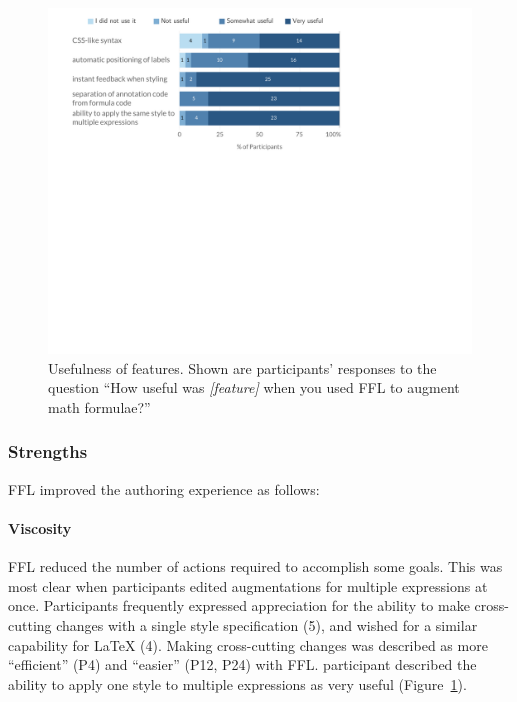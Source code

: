\begin{figure}
    \centering
    \includegraphics[width=\linewidth]{fig/Useful.pdf}
    \vspace{-3ex}
    \caption{Usefulness of features. \normalfont Shown are participants' responses to the question ``How useful was \emph{[feature]} when you used FFL to augment math formulae?''
    }
    \label{fig:features_use}
\end{figure}

\subsubsection{Strengths} FFL improved the authoring experience as follows:

\paragraph{Viscosity}
FFL reduced the number of actions required to accomplish some goals. This was most clear when participants edited augmentations for multiple expressions at once. Participants frequently expressed appreciation for the ability to make cross-cutting changes with a single style specification (5), and wished for a similar capability for LaTeX (4). Making cross-cutting changes was described as more ``efficient'' (P4) and ``easier'' (P12, P24) with FFL.  participant described the ability to apply one style to multiple expressions as very useful (Figure~\ref{fig:features_use}).

